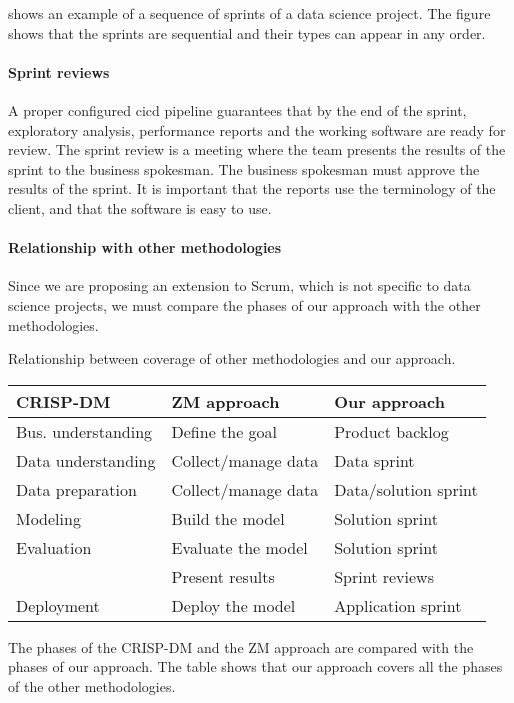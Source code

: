  shows an example of a sequence of sprints of a data science project.
The figure shows that the sprints are sequential and their types can appear in
any order.

\paragraph{Sprint reviews}

A proper configured \gls{cicd} pipeline guarantees that by the end of the sprint,
exploratory analysis, performance reports and the working software are ready for review.
The sprint review is a meeting where the team presents the results of the sprint to the
business spokesman.  The business spokesman must approve the results of the sprint.
It is important that the reports use the terminology of the client, and that the
software is easy to use.


\paragraph{Relationship with other methodologies}

Since we are proposing an extension to Scrum, which is not specific to data science
projects, we must compare the phases of our approach with the other methodologies.

\begin{tablebox}[label=tab:phases]{Relationship between coverage of other methodologies and our approach.}
  \centering
  \small %
  \begin{tabular}{lll}
    \toprule
    \textbf{CRISP-DM} & \textbf{ZM approach} & \textbf{Our approach} \\
    \midrule
    Bus. understanding & Define the goal & Product backlog \\
    Data understanding & Collect/manage data & Data sprint \\
    Data preparation & Collect/manage data & Data/solution sprint \\
    Modeling & Build the model & Solution sprint \\
    Evaluation & Evaluate the model & Solution sprint \\
    & Present results & Sprint reviews \\
    Deployment & Deploy the model & Application sprint \\
    \bottomrule
  \end{tabular}
  \tcblower
  The phases of the CRISP-DM and the ZM approach are compared with the phases of our
  approach.  The table shows that our approach covers all the phases of the other
  methodologies.
\end{tablebox}

